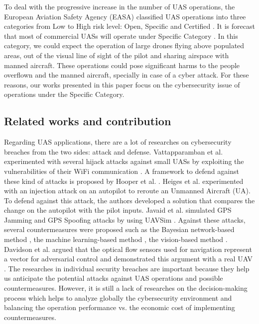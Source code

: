 \documentclass[a4paper, 10, conference]{ieeeconf}  %
\begin{document}
To deal with the progressive increase in the number of UAS operations, the European Aviation Safety Agency (EASA) classified UAS operations into three categories from Low to High risk level: Open, Specific and Certified \cite{A-NPA2015}. It is forecast that most of commercial UASs will operate under Specific Category \cite{EDOS2016}. In this category, we could expect the operation of large drones flying above populated areas, out of the visual line of sight of the pilot and sharing airspace with manned aircraft. These operations could pose significant harms to the people overflown and the manned aircraft, specially in case of a cyber attack. For these reasons, our works presented in this paper focus on the cybersecurity issue of operations under the Specific Category.



\subsection {Related works and contribution}

Regarding UAS applications, there are a lot of researches on cybersecurity breaches from the two sides: attack and defense. Vattapparamban et al. experimented with several hijack attacks against small UASs by exploiting the vulnerabilities of their WiFi communication \cite{vattapparamban_drones_2016}. A framework to defend against these kind of attacks is proposed by Hooper et al. \cite{7795496}. Heiges et al. \cite{heiges_how_nodate} experimented with an injection attack on an autopilot to reroute an Unmanned Aircraft (UA). To defend against this attack, the authors developed a solution that compares the change on the autopilot with the pilot inputs. Javaid et al. simulated GPS Jamming and GPS Spoofing attacks by using UAVSim \cite{10.1177/0037549716685874}. Against these attacks, several countermeasures were proposed such as the Bayesian network-based method \cite{7991465}, the machine learning-based method \cite{8081999,8651804}, the vision-based method \cite{8288496}. Davidson et al. argued that the optical flow sensors used for navigation represent a vector for adversarial control and demonstrated this argument with a real UAV \cite{198490}. The researches in individual security breaches are important because they help us anticipate the potential attacks against UAS operations and possible countermeasures. However, it is still a lack of researches on the decision-making process which helps to analyze globally the cybersecurity environment and balancing the operation performance vs. the economic cost of implementing countermeasures. 
\end{document}
